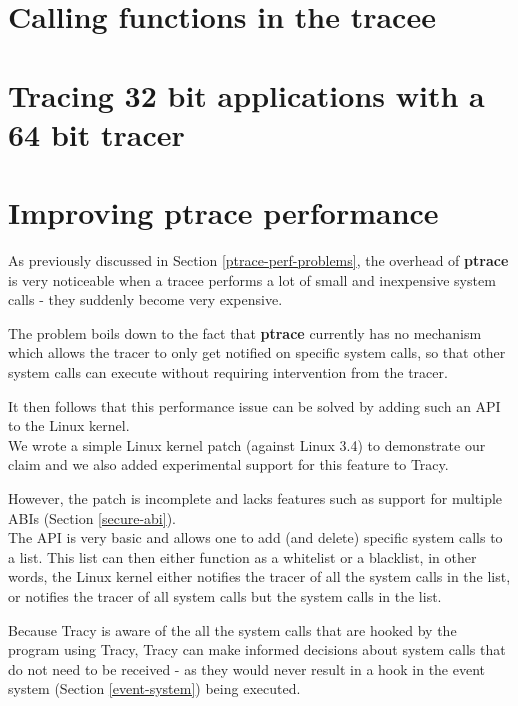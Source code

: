 \documentclass[a4paper, 10pt]{report}
\begin{document}
\section{Calling functions in the tracee}

\section{Tracing 32 bit applications with a 64 bit tracer}

\section{Improving ptrace performance}
\label{ptrace-perf}

As previously discussed in Section \ref{ptrace-perf-problems}, the overhead
of \textbf{ptrace} is very noticeable when a tracee performs a lot of
small and inexpensive system calls - they suddenly become very expensive.

The problem boils down to the fact that \textbf{ptrace} currently
has no mechanism which allows the tracer to only get notified on specific
system calls, so that other system calls can execute without requiring
intervention from the tracer.

It then follows that this performance
issue can be solved by adding such an API to the Linux kernel. \\

We wrote a simple Linux kernel patch (against Linux 3.4) to demonstrate
our claim and we also added experimental support for this feature to Tracy.

However, the patch is incomplete and lacks features such as support for
multiple ABIs (Section \ref{secure-abi}). \\

The API is very basic and allows one to add (and delete) specific system
calls to a list. This list can then either function as a whitelist or a
blacklist, in other words, the Linux kernel either notifies the tracer of
all the system calls in the list, or notifies the tracer of all system calls
but the system calls in the list.


Because Tracy is aware of the all the system calls that are hooked by the
program using Tracy, Tracy can make informed decisions about system calls
that do not need to be received - as they would never result in a hook in
the event system (Section \ref{event-system}) being executed.
\end{document}
